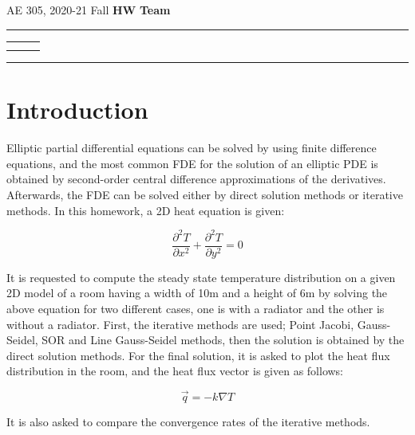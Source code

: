 \documentclass[letterpaper,12pt]{article}
\begin{document}
\begin{center}
AE 305, 2020-21 Fall \hfill \textbf{HW \HWno} \hfill \textbf{Team \TeamNo} \\
\noindent\rule{\textwidth}{0.4pt}
\begin{tabular}{p{} | p{} | p{} }
	\AuthorOneName&\AuthorTwoName&\AuthorThreeName\\
	\textit{\AuthorOneID}&\textit{\AuthorTwoID}&\textit{\AuthorThreeID}
\end{tabular}
\noindent\rule{\textwidth}{0.4pt}
\end{center}


\section{Introduction}
Elliptic partial differential equations can be solved by using finite difference equations,
and the most common FDE for the solution of an elliptic PDE is obtained by second-order
central difference approximations of the derivatives. Afterwards, the FDE can
be solved either by direct solution methods or iterative methods. In this homework, a 2D
heat equation is given:

\begin{equation}
	\frac{\partial^2T}{\partial x^2} + \frac{\partial^2T}{\partial y^2} = 0
	\label{eqn:heateqn}
\end{equation}

It is requested to compute the steady state temperature distribution on a given 2D model
of a room having a width of 10m and a height of 6m by solving the above equation for 
two different cases, one is with a radiator and the other is without a radiator. First,
the iterative methods are used; Point Jacobi, Gauss-Seidel, SOR and Line Gauss-Seidel
methods, then the solution is obtained by the direct solution methods. For the final
solution, it is asked to plot the heat flux distribution in the room, and the heat flux
vector is given as follows:

\begin{equation}
	\vec{q} = -k \nabla T
	\label{eqn:heatflux}
\end{equation}

It is also asked to compare the convergence rates of the iterative methods.
\end{document}
